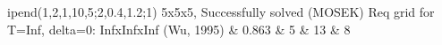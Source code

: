 ipend(1,2,1,10,5;2,0.4,1.2;1) 5x5x5, Successfully solved (MOSEK) Req grid for T=Inf, delta=0: InfxInfxInf (Wu, 1995) 
	& 0.863 & 5 & 13 & 8 \\